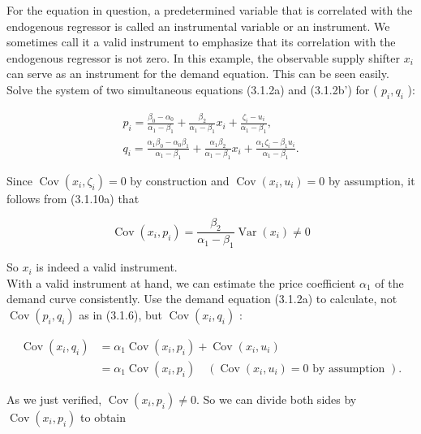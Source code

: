 \documentclass[10pt]{article}
\begin{document}
For the equation in question, a predetermined variable that is correlated with the endogenous regressor is called an instrumental variable or an instrument. We sometimes call it a valid instrument to emphasize that its correlation with the endogenous regressor is not zero. In this example, the observable supply shifter $x_{i}$ can serve as an instrument for the demand equation. This can be seen easily. Solve the system of two simultaneous equations (3.1.2a) and (3.1.2b') for ( $p_{i}, q_{i}$ ):


\begin{gather*}
p_{i}=\frac{\beta_{0}-\alpha_{0}}{\alpha_{1}-\beta_{1}}+\frac{\beta_{2}}{\alpha_{1}-\beta_{1}} x_{i}+\frac{\zeta_{i}-u_{i}}{\alpha_{1}-\beta_{1}},  \tag{3.1.10a}\\
q_{i}=\frac{\alpha_{1} \beta_{0}-\alpha_{0} \beta_{1}}{\alpha_{1}-\beta_{1}}+\frac{\alpha_{1} \beta_{2}}{\alpha_{1}-\beta_{1}} x_{i}+\frac{\alpha_{1} \zeta_{i}-\beta_{1} u_{i}}{\alpha_{1}-\beta_{1}} . \tag{3.1.10b}
\end{gather*}


Since $\operatorname{Cov}\left(x_{i}, \zeta_{i}\right)=0$ by construction and $\operatorname{Cov}\left(x_{i}, u_{i}\right)=0$ by assumption, it follows from (3.1.10a) that

$$
\operatorname{Cov}\left(x_{i}, p_{i}\right)=\frac{\beta_{2}}{\alpha_{1}-\beta_{1}} \operatorname{Var}\left(x_{i}\right) \neq 0
$$

So $x_{i}$ is indeed a valid instrument.\\
With a valid instrument at hand, we can estimate the price coefficient $\alpha_{1}$ of the demand curve consistently. Use the demand equation (3.1.2a) to calculate, not $\operatorname{Cov}\left(p_{i}, q_{i}\right)$ as in (3.1.6), but $\operatorname{Cov}\left(x_{i}, q_{i}\right)$ :

$$
\begin{aligned}
\operatorname{Cov}\left(x_{i}, q_{i}\right) & =\alpha_{1} \operatorname{Cov}\left(x_{i}, p_{i}\right)+\operatorname{Cov}\left(x_{i}, u_{i}\right) \\
& =\alpha_{1} \operatorname{Cov}\left(x_{i}, p_{i}\right) \quad\left(\operatorname{Cov}\left(x_{i}, u_{i}\right)=0 \text { by assumption }\right) .
\end{aligned}
$$

As we just verified, $\operatorname{Cov}\left(x_{i}, p_{i}\right) \neq 0$. So we can divide both sides by $\operatorname{Cov}\left(x_{i}, p_{i}\right)$ to obtain
\end{document}
